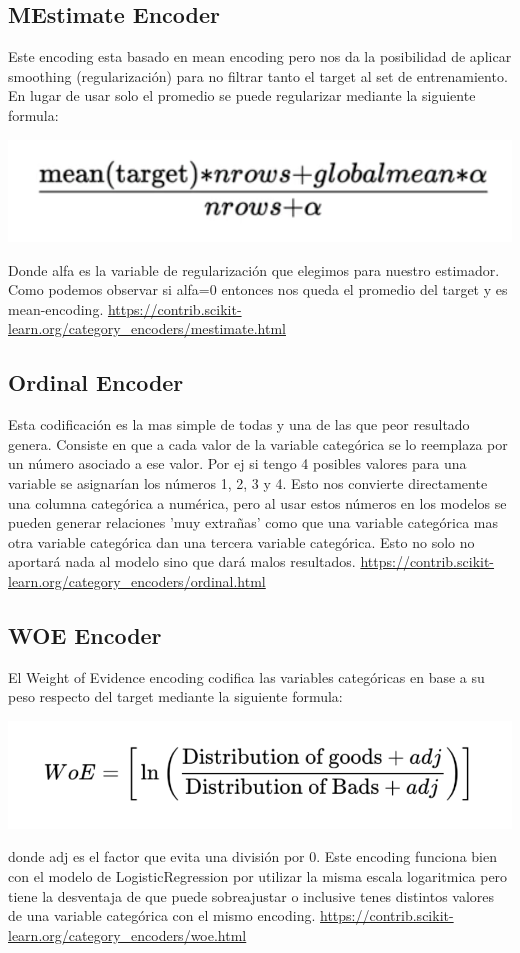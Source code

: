 \documentclass[12pt,a4paper]{article}
\begin{document}
\subsection{MEstimate Encoder}
Este encoding esta basado en mean encoding pero nos da la posibilidad de aplicar smoothing (regularización) para no filtrar tanto el target al set de entrenamiento. En lugar de usar solo el promedio se puede regularizar mediante la siguiente formula:
\begin{center}
    \includegraphics[scale=0.5]{imgs/formula-smoothing.png}
\end{center}
Donde alfa es la variable de regularización que elegimos para nuestro estimador. Como podemos observar si alfa=0 entonces nos queda el promedio del target y es mean-encoding.
\url{https://contrib.scikit-learn.org/category_encoders/mestimate.html}

\subsection{Ordinal Encoder}
Esta codificación es la mas simple de todas y una de las que peor resultado genera. Consiste en que a cada valor de la variable categórica se lo reemplaza por un número asociado a ese valor. Por ej si tengo 4 posibles valores para una variable se asignarían los números 1, 2, 3 y 4.
Esto nos convierte directamente una columna categórica a numérica, pero al usar estos números en los modelos se pueden generar relaciones 'muy extrañas' como que una variable categórica mas otra variable categórica dan una tercera variable categórica. Esto no solo no aportará nada al modelo sino que dará malos resultados.
\url{https://contrib.scikit-learn.org/category_encoders/ordinal.html}

\subsection{WOE Encoder}
El Weight of Evidence encoding codifica las variables categóricas en base a su peso respecto del target mediante la siguiente formula:
\begin{center}
    \includegraphics[scale=0.5]{imgs/WOE.png}
\end{center}
donde adj es el factor que evita una división por 0.
Este encoding funciona bien con el modelo de LogisticRegression por utilizar la misma escala logaritmica pero tiene la desventaja de que puede sobreajustar o inclusive tenes distintos valores de una variable categórica con el mismo encoding. 
\url{https://contrib.scikit-learn.org/category_encoders/woe.html}
\end{document}
